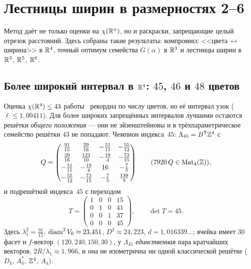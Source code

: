 \section{Лестницы ширин в размерностях 2--6}
\label{sec:ladders}

Метод даёт не только оценки на $\chi(\mathbb{R}^n)$, но и раскраски, запрещающие целый
отрезок расстояний. Здесь собраны такие результаты: компромисс
<<цвета\,$\leftrightarrow$\,ширина>> в $\mathbb{R}^4$, точный оптимум семейства
$G(\alpha)$ в $\mathbb{R}^3$ и лестницы ширин в $\mathbb{R}^3$, $\mathbb{R}^5$, $\mathbb{R}^6$.

\subsection{Более широкий интервал в $\mathbb{R}^4$: $45$, $46$ и $48$ цветов}
\label{ssec:wide45}

Оценка $\chi(\mathbb{R}^4)\le43$ работы~\cite{Bounds} рекордна по числу цветов, но её
интервал узок ($\ell\le1{,}00411$). Для более широких запрещённых интервалов
лучшими остаются решётки \emph{общего положения} --- они не эйзенштейновы и в
трёхпараметрическое семейство решётки $43$ не попадают. Чемпион индекса~$45$:
$\Lambda_{45}=B^{\mathsf T}\mathbb{Z}^4$ с
\begin{equation}\label{eq:gram}
Q=\begin{pmatrix}
\tfrac{91}{15}  & \tfrac{29}{16} & -\tfrac{51}{11} & -\tfrac{55}{12}\\[3pt]
\tfrac{29}{16}  & \tfrac{123}{10}& -\tfrac{19}{4}  & -\tfrac{73}{15}\\[3pt]
-\tfrac{51}{11} & -\tfrac{19}{4} & 16              & -\tfrac{7}{5}\\[3pt]
-\tfrac{55}{12} & -\tfrac{73}{15}& -\tfrac{7}{5}   & \tfrac{139}{9}
\end{pmatrix}
\qquad(7920\,Q\in\mathrm{Mat}_4(\mathbb{Z})),
\end{equation}
и подрешёткой индекса~$45$ с переходом
\begin{equation}\label{eq:hnf}
T=\begin{pmatrix}1&0&0&15\\0&1&0&41\\0&0&1&37\\0&0&0&45\end{pmatrix},
\qquad\det T=45 .
\end{equation}
Здесь $\lambda_1^2=\tfrac{91}{15}$, $\operatorname{diam}^2V_0\approx23{,}451$,
$D^2\approx24{,}223$, $d=1{,}016339\ldots$; ячейка имеет $30$ фасет и
$f$-вектор $(120,240,150,30)$, у $\Lambda_{45}$ \emph{единственная} пара
кратчайших векторов, $2R/\lambda_1\approx1{,}966$, и она не изометрична ни
одной классической решётке ($D_4$, $A_4^*$, $\mathbb{Z}^4$, $A_4$).


